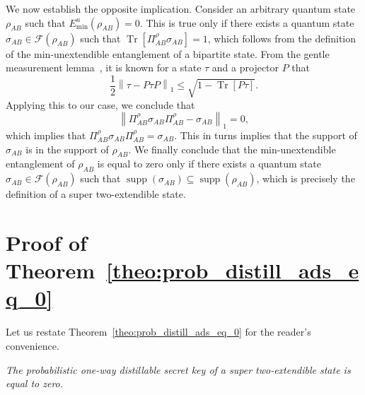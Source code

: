 \documentclass[twocolumn,letterpaper, dvipsnames,allowtoday, accepted = 2025-12-31]{quantumarticle}
\begin{document}
We now establish the opposite implication. Consider an arbitrary quantum state $\rho_{AB}$ such that $E^u_{\min}\!\left(\rho_{AB}\right) = 0$. This is true only if there exists a quantum state $\sigma_{AB}\in \mathcal{F}\!\left(\rho_{AB}\right)$ such that $\operatorname{Tr}\!\left[\Pi^{\rho}_{AB}\sigma_{AB}\right] = 1$, which follows from the definition of the min-unextendible entanglement of a bipartite state. From the gentle measurement lemma~\cite[Lemma~5]{1023345}, it is known for a state $\tau$ and a projector $P$ that
\begin{equation}
    \frac{1}{2} \left \| \tau - P \tau P\right\|_1 \leq \sqrt{1 - \operatorname{Tr}[P \tau]}.
\end{equation}
Applying this to our case, we conclude that 
\begin{equation} 
\left\|\Pi^{\rho}_{AB}\sigma_{AB}  \Pi^{\rho}_{AB} - \sigma_{AB} \right\|_1 = 0,
\end{equation}
which implies that $\Pi^{\rho}_{AB}\sigma_{AB}  \Pi^{\rho}_{AB} = \sigma_{AB}$. This in turns implies that the support of $\sigma_{AB}$ is in the support of $\rho_{AB}$. We finally conclude that the min-unextendible entanglement of $\rho_{AB}$ is equal to zero only if there exists a quantum state $\sigma_{AB}\in \mathcal{F}\!\left(\rho_{AB}\right)$ such that $\operatorname{supp}\!\left(\sigma_{AB}\right) \subseteq \operatorname{supp}\!\left(\rho_{AB}\right)$, which is precisely the definition of a super two-extendible state.

\section{Proof of Theorem~\ref{theo:prob_distill_ads_eq_0}}

\label{app:prob_distill_eras_st_eq_0_proof}

    Let us restate Theorem~\ref{theo:prob_distill_ads_eq_0} for the reader's convenience.
    
    \emph{The probabilistic one-way distillable secret key of a super two-extendible state is equal to zero.}
    
    \medskip
\end{document}

